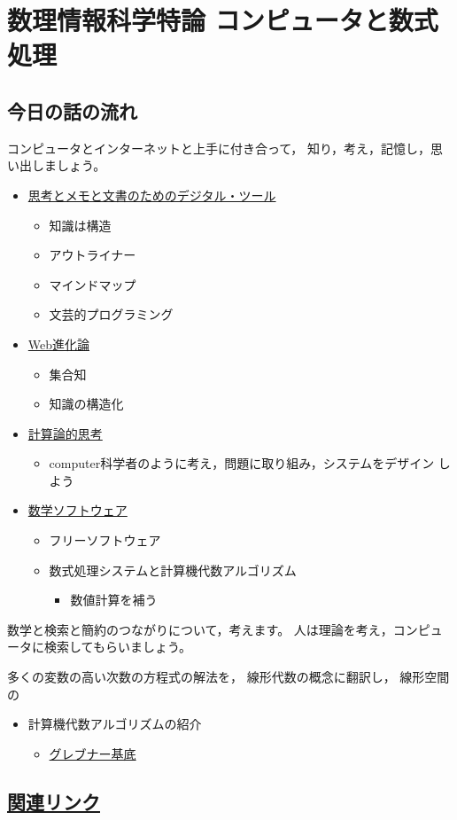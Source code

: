 \documentclass[a4j]{jarticle}
\author{Masayuki Suzuki}
\date{\today}
\title{}
\begin{document}
\tableofcontents

\section{数理情報科学特論 コンピュータと数式処理}
\label{sec:org04a6170}

\subsection{今日の話の流れ}
\label{sec:org6c2aedd}

コンピュータとインターネットと上手に付き合って，
知り，考え，記憶し，思い出しましょう。

\begin{itemize}
\item \href{./org/digital\_tools.org}{思考とメモと文書のためのデジタル・ツール}
\begin{itemize}
\item 知識は構造
\item アウトライナー
\item マインドマップ
\item 文芸的プログラミング
\end{itemize}

\item \href{./org/web.org}{Web進化論}
\begin{itemize}
\item 集合知
\item 知識の構造化
\end{itemize}

\item \href{./org/comp\_thinking.org}{計算論的思考}
\begin{itemize}
\item computer科学者のように考え，問題に取り組み，システムをデザイン
しよう
\end{itemize}

\item \href{./org/math-soft.org}{数学ソフトウェア}
\begin{itemize}
\item フリーソフトウェア
\item 数式処理システムと計算機代数アルゴリズム
\begin{itemize}
\item 数値計算を補う
\end{itemize}
\end{itemize}
\end{itemize}

数学と検索と簡約のつながりについて，考えます。
人は理論を考え，コンピュータに検索してもらいましょう。

多くの変数の高い次数の方程式の解法を，
線形代数の概念に翻訳し，
線形空間の

\begin{itemize}
\item 計算機代数アルゴリズムの紹介
\begin{itemize}
\item \href{./org/groebner.org}{グレブナー基底}
\end{itemize}
\end{itemize}

\subsection{\href{./org/links.org}{関連リンク}}
\label{sec:orgb9d1a57}
\end{document}
